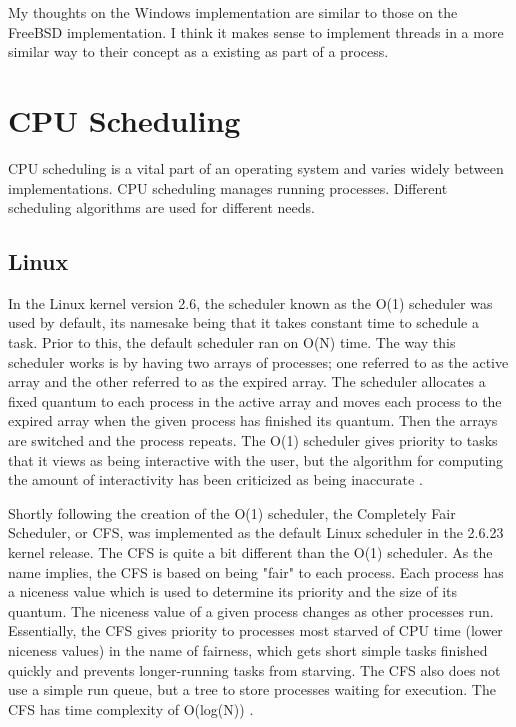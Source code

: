 \documentclass[10pt,draftclsnofoot,onecolumn,journal,compsoc]{IEEEtran}
\begin{document}
My thoughts on the Windows implementation are similar to those on the FreeBSD implementation. I think it makes sense to implement threads in a more similar way to their concept as a existing as part of a process.

\section{CPU Scheduling}
CPU scheduling is a vital part of an operating system and varies widely between implementations. CPU scheduling manages running processes. Different scheduling algorithms are used for different needs. 

\subsection{Linux}
In the Linux kernel version 2.6, the scheduler known as the O(1) scheduler was used by default, its namesake being that it takes constant time to schedule a task. Prior to this, the default scheduler ran on O(N) time. The way this scheduler works is by having two arrays of processes; one referred to as the active array and the other referred to as the expired array. The scheduler allocates a fixed quantum to each process in the active array and moves each process to the expired array when the given process has finished its quantum. Then the arrays are switched and the process repeats. The O(1) scheduler gives priority to tasks that it views as being interactive with the user, but the algorithm for computing the amount of interactivity has been criticized as being inaccurate \cite{linux_shd}.

Shortly following the creation of the O(1) scheduler, the Completely Fair Scheduler, or CFS, was implemented as the default Linux scheduler in the 2.6.23 kernel release. The CFS is quite a bit different than the O(1) scheduler. As the name implies, the CFS is based on being "fair" to each process. Each process has a niceness value which is used to determine its priority and the size of its quantum. The niceness value of a given process changes as other processes run. Essentially, the CFS gives priority to processes most starved of CPU time (lower niceness values) in the name of fairness, which gets short simple tasks finished quickly and prevents longer-running tasks from starving. The CFS also does not use a simple run queue, but a tree to store processes waiting for execution. The CFS has time complexity of O(log(N)) \cite{linux_shd}.
\end{document}
